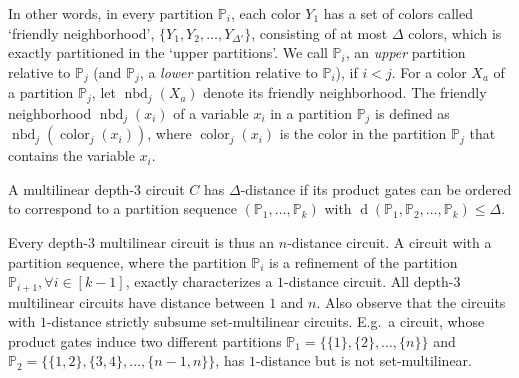 \documentclass[final,oneeqnum, onethmnum, onefignum]{siamltex1213}
\renewcommand{\P}{\mathbb P}
\newcommand{\F}{\mathbb F}
\newcommand{\di}{\Delta} %
\newcommand{\lis}[3]{{#1}_1 #2 {#1}_2 #2\dots #2 {#1}_{#3}}
\newcommand{\Dx}{D(\mathbf{x})}
\DeclareMathOperator{\dist}{d}
\DeclareMathOperator{\nbd}{nbd}
\DeclareMathOperator{\Color}{color}
\renewcommand{\H}{\mathbb H}
\renewcommand{\o}[1]{\overline{#1}}
\newtheorem{observation}[theorem]{Observation}
\begin{document}
In other words, in every partition $\P_i$,
each color $Y_1$ has a set of colors called `friendly neighborhood',
$\{\lis{Y}{,}{\di'}\}$,
consisting of at most $\di$ colors,
which is exactly partitioned in the `upper partitions'.
We call $\P_i$, an {\em upper} partition relative to $\P_j$ 
(and $\P_j$, a {\em lower} partition relative to $\P_i$),
if $i < j$.
For a color $X_a$ of a partition $\P_j$, let $\nbd_j (X_a)$ denote its friendly neighborhood.
The friendly neighborhood $\nbd_j (x_i)$ of a variable $x_i$ in a partition $\P_j$ is defined as $\nbd_j (\Color_j(x_i))$, where $\Color_j(x_i)$ is the color in the partition $\P_j$ that contains the variable $x_i$.



\begin{definition}[$ \di $-distance circuits]
A multilinear depth-$3$ circuit $ C $
has $ \di $-distance if its product gates can be ordered to correspond to a partition sequence $(\P_1,\dots,\P_k)$ with $\dist (\lis{\P}{,}{k}) \le \di$.

\end{definition}


Every depth-$3$ multilinear circuit is thus an $n$-distance circuit. 
A circuit with a partition sequence, 
where the partition $\P_i$ is a refinement of the partition $\P_{i+1}, 
\forall i \in [k-1]$, exactly characterizes a $1$-distance circuit. 
All depth-$3$ multilinear circuits have distance between $1$ and $n$.
Also observe that the circuits with $1$-distance strictly subsume set-multilinear circuits.
E.g.\ a circuit, whose product gates
induce two different partitions
$\P_1 = \{\{1\}, \{2\}, \dots, \{n\}\}$ and 
$\P_2 = \{ \{1,2\} , \{3,4\} , \dots, \{n-1,n\} \}$, 
has $1$-distance but is not set-multilinear. 
\end{document}
